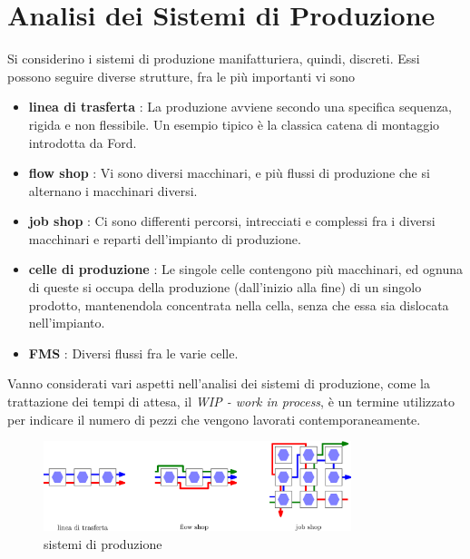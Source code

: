 \documentclass[10pt, letterpaper]{report}
\begin{document}
\section{Analisi dei Sistemi di Produzione}
Si considerino i sistemi di produzione manifatturiera, quindi, discreti. Essi possono seguire diverse strutture, 
fra le più importanti vi sono\begin{itemize}
    \item \textbf{linea di trasferta } : La produzione avviene secondo una specifica sequenza, rigida e non 
    flessibile. Un esempio tipico è la classica catena di montaggio introdotta da Ford. 
    \item \textbf{flow shop} : Vi sono diversi macchinari, e più flussi di produzione che si 
    alternano i macchinari diversi. 
    \item \textbf{job shop} : Ci sono differenti percorsi, intrecciati e complessi fra i diversi macchinari 
    e reparti dell'impianto di produzione. 
    \item  \textbf{celle di produzione} : Le singole celle contengono più macchinari, ed ognuna di queste 
    si occupa della produzione (dall'inizio alla fine) di un singolo prodotto, mantenendola concentrata 
    nella cella, senza che essa sia dislocata nell'impianto. 
    \item \textbf{FMS} : Diversi flussi fra le varie celle.
\end{itemize}
Vanno considerati vari aspetti nell'analisi dei sistemi di produzione, come la trattazione dei tempi di 
attesa, il \textit{WIP - work in process}, è un termine utilizzato per indicare il numero di pezzi che vengono 
lavorati contemporaneamente.
\begin{figure}[h!]
    \centering
    \includegraphics[width=0.8\textwidth ]{images/lineaFlowJob.eps}
    \caption{sistemi di produzione}
    \label{fig:sisprod}
\end{figure} 
\end{document}
